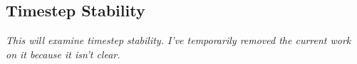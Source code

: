 \documentclass[10pt,a4paper,titlepage]{report}
\begin{document}
\subsection{Timestep Stability}
\textit{This will examine timestep stability. I've temporarily removed the current work on it because it isn't clear.}
\end{document}
